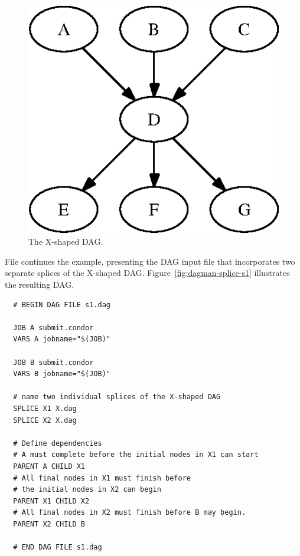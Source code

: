 \begin{figure}
\centering
\includegraphics{user-man/splice-X}





\caption{\label{fig:dagman-splice-X} The X-shaped DAG.}
\end{figure}


File  continues the example, presenting
the DAG input file that
incorporates two separate splices of the X-shaped DAG.
Figure~\ref{fig:dagman-splice-s1} illustrates the resulting DAG.

\begin{verbatim}
  # BEGIN DAG FILE s1.dag

  JOB A submit.condor
  VARS A jobname="$(JOB)"

  JOB B submit.condor
  VARS B jobname="$(JOB)"

  # name two individual splices of the X-shaped DAG
  SPLICE X1 X.dag
  SPLICE X2 X.dag

  # Define dependencies
  # A must complete before the initial nodes in X1 can start
  PARENT A CHILD X1
  # All final nodes in X1 must finish before 
  # the initial nodes in X2 can begin
  PARENT X1 CHILD X2
  # All final nodes in X2 must finish before B may begin.
  PARENT X2 CHILD B

  # END DAG FILE s1.dag
\end{verbatim}

